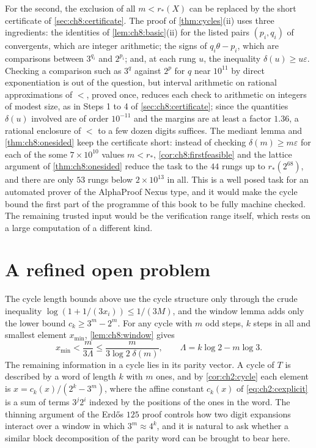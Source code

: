 For the second, the exclusion of all $m<r_*(X)$ can be replaced by the short
certificate of \cref{sec:ch8:certificate}. The proof of \cref{thm:cycles}(ii) uses three ingredients: the
identities of \cref{lem:ch8:basic}(ii) for the listed pairs $(p_i,q_i)$ of convergents, which
are integer arithmetic; the signs of $q_i\theta-p_i$, which are comparisons
between $3^{q_i}$ and $2^{p_i}$; and, at each rung $u$, the inequality
$\delta(u)\geq u\varepsilon$. Checking a comparison such as
$3^{q}$ against $2^{p}$ for $q$ near $10^{11}$ by direct exponentiation is
out of the question, but interval arithmetic on rational approximations of
$\lt$, proved once, reduces each check to arithmetic on integers of modest
size, as in Steps 1 to 4 of \cref{sec:ch8:certificate}; since the quantities $\delta(u)$ involved are of order $10^{-11}$ and
the margins are at least a factor $1.36$, a rational enclosure of $\lt$ to a
few dozen digits suffices.
The mediant lemma and \cref{thm:ch8:onesided} keep the certificate short: instead of checking $\delta(m)\geq m\varepsilon$ for each of the some $7\times10^{10}$ values $m<r_*$, \cref{cor:ch8:firstfeasible} and the lattice argument of
\cref{thm:ch8:onesided} reduce the task to the $44$ rungs up to
$r_*(2^{68})$, and there are only $53$ rungs below $2\times10^{13}$ in all.
This is a well posed task for an automated prover of the AlphaProof Nexus
type, and it would make the cycle bound the first part of the programme of
this book to be fully machine checked. The remaining trusted input would be
the verification range itself, which rests on a large computation of a
different kind.

\section{A refined open problem}\label{sec:ch8:refined}

The cycle length bounds above use the cycle structure only through the crude inequality $\log(1+1/(3x_i))\leq1/(3M)$, and the window lemma adds only the lower bound $c_k\geq3^m-2^m$.
For any cycle with $m$ odd steps, $k$ steps in all and smallest element $x_{\min}$, \cref{lem:ch8:window} gives
\[
  x_{\min}<\frac{m}{3\Lambda}\le\frac{m}{3\log2\;\delta(m)},\qquad\Lambda=k\log2-m\log3 .
\]
The remaining information in a cycle lies in its parity vector. A cycle of $T$
is described by a word of length $k$ with $m$ ones, and by
\cref{cor:ch2:cycle} each element is $x=c_k(x)/(2^k-3^m)$, where the affine
constant $c_k(x)$ of \eqref{eq:ch2:cexplicit} is a sum of terms $3^{j}2^{i}$
indexed by the positions of the ones in the word. The thinning argument of the
Erd\H{o}s $125$ proof controls how two digit expansions interact over a window
in which $3^m\approx4^k$, and it is natural to ask whether a similar block
decomposition of the parity word can be brought to bear here.

